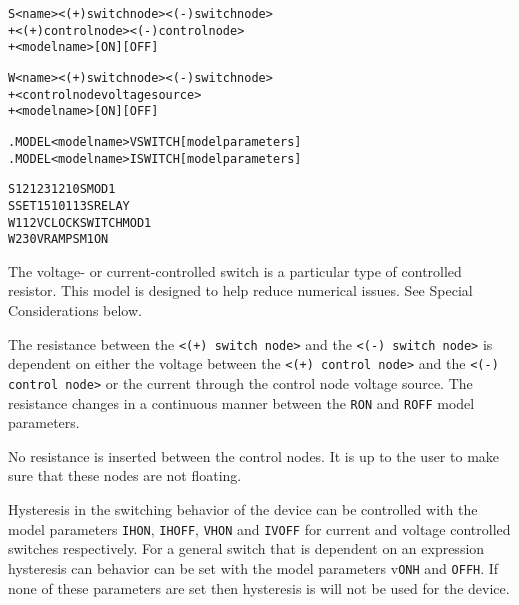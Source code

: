 


\begin{Device}

\device
\begin{alltt}
S<name> <(+) switch node> <(-) switch node>
+ <(+) control node> <(-) control node>
+ <model name> [ON] [OFF]

W<name> <(+) switch node> <(-) switch node>
+ <control node voltage source>
+ <model name> [ON] [OFF]
\end{alltt}

\model
\begin{alltt}
.MODEL <model name> VSWITCH [model parameters]
.MODEL <model name> ISWITCH [model parameters]
\end{alltt}

\examples
\begin{alltt}
S1 21 23 12 10 SMOD1
SSET 15 10 1 13 SRELAY
W1 1 2 VCLOCK SWITCHMOD1
W2 3 0 VRAMP SM1 ON
\end{alltt}

\comments

The voltage- or current-controlled switch is a particular type of
controlled resistor. This model is designed to help reduce numerical
issues. See Special Considerations below.

The resistance between the \texttt{<(+) switch node>} and the
\texttt{<(-) switch node>} is dependent on either the voltage between
the \texttt{<(+) control node>} and the \texttt{<(-) control node>} or
the current through the control node voltage source. The resistance
changes in a continuous manner between the \texttt{RON} and
\texttt{ROFF} model parameters.

No resistance is inserted between the control nodes.  It is up to the
user to make sure that these nodes are not floating.

Hysteresis in the switching behavior of the device can be controlled with 
the model parameters \texttt{IHON}, \texttt{IHOFF}, \texttt{VHON} and
\texttt{IVOFF} for current and voltage controlled switches respectively.  
For a general switch that is dependent on an expression hysteresis can 
behavior can be set with the model parameters v\texttt{ONH} and \texttt{OFFH}. 
If none of these parameters are set then hysteresis is will not be used 
for the device. 


\end{Device}
